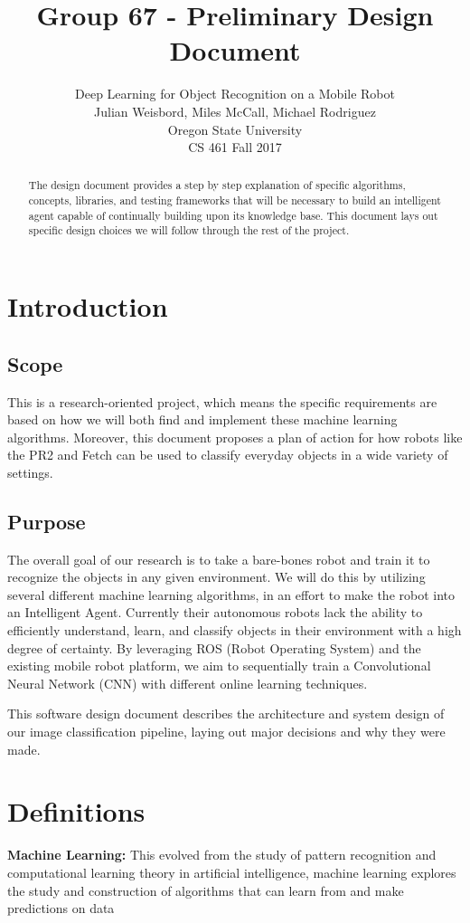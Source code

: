 \documentclass[draftclsnofoot, onecolumn, 10pt, compsoc]{IEEEtran}
\title{Group 67 - Preliminary Design Document}
\author{
	Deep Learning for Object Recognition on a Mobile Robot \\
	Julian Weisbord, Miles McCall, Michael Rodriguez \\
	Oregon State University \\
	CS 461 Fall 2017
}
\begin{document}
	\maketitle
	
	\begin{abstract}
		\noindent The design document provides a step by step explanation of specific algorithms, concepts, libraries, and testing frameworks that will be necessary to build an intelligent agent capable of continually building upon its knowledge base. This document lays out specific design choices we will follow through the rest of the project. 
	\end{abstract}
	\newpage
	
	\tableofcontents
	\newpage
	
	\section{Introduction}
		\subsection{Scope}
			This is a research-oriented project, which means the specific requirements are based on how we will both find and implement these machine learning algorithms. Moreover, this document proposes a plan of action for how robots like the PR2 and Fetch can be used to classify everyday objects in a wide variety of settings.
		
		\subsection{Purpose}
		The overall goal of our research is to take a bare-bones robot and train it to recognize the objects in any given environment. We will do this by utilizing several different machine learning algorithms, in an effort to make the robot into an Intelligent Agent. Currently their autonomous robots lack the ability to efficiently understand, learn, and classify objects in their environment with a high degree of certainty. By leveraging ROS (Robot Operating System) and the existing mobile robot platform, we aim to sequentially train a Convolutional Neural Network (CNN) with different online learning techniques.
		
		This software design document describes the architecture and system design of our image classification pipeline, laying out major decisions and why they were made. 
	
	\section{Definitions}
		\textbf{Machine Learning:} This evolved from the study of pattern recognition and computational learning theory in artificial intelligence, machine learning explores the study and construction of algorithms that can learn from and make predictions on data \cite{neuralnets}
		
\end{document}
